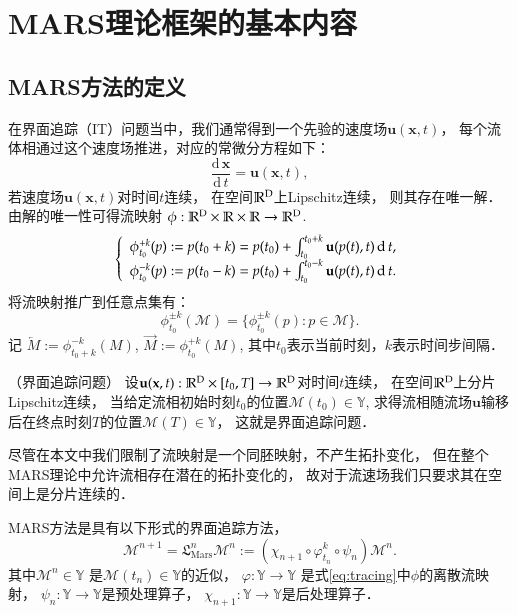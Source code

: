 \section{MARS理论框架的基本内容}
\label{sec:MARS}
\subsection{MARS方法的定义}
在界面追踪（IT）问题当中，我们通常得到一个先验的速度场$\mathbf{u}(\mathbf{x},t)$，
每个流体相通过这个速度场推进，对应的常微分方程如下：
\begin{equation}
\label{volEquation}
\frac{\mathrm{d}\, \mathbf{x}}{\mathrm{d}\, t}=\mathbf{u}(\mathbf{x},t),
\end{equation}
若速度场$\mathbf{u}(\mathbf{x},t)$对时间$t$连续，
在空间$\mathbb{R}^{\textup{D}}$上Lipschitz连续，
则其存在唯一解．由解的唯一性可得流映射 $\phi: \mathbb{R}^{\textup{D}}\times \mathbb{R}\times\mathbb{R}\rightarrow \mathbb{R}^{\text{D}}$.
\begin{equation} 
\label{eq:tracing}
\renewcommand{\arraystretch}{1.3}
\left\{
\begin{array}{l}
\phi_{t_0}^{+k}(p) := p(t_0+k) 
= p(t_0) + \int_{t_0}^{t_0+k} \mathbf{u}(p(t),t)\,\mathrm{d}\, t,
\\
\phi_{t_0}^{-k}(p) := p(t_0-k) 
= p(t_0) + \int_{t_0}^{t_0-k} \mathbf{u}(p(t),t)\,\mathrm{d}\,t.
\end{array}
\right.
\end{equation}
将流映射推广到任意点集有：
\begin{displaymath}
\phi_{t_0}^{\pm k}({\mathcal M})  
= \{\phi_{t_0}^{\pm k}(p) : p\in {\mathcal M}\}.
\end{displaymath}
记 $\overleftarrow{M}:=\phi_{t_0+k}^{-k}(M)$, $\overrightarrow{M}:=\phi_{t_0}^{+k}(M)$, 
其中$t_0$表示当前时刻，$k$表示时间步间隔．

\begin{defn}（界面追踪问题）
	\label{defn:ITproblem}
	设$\mathbf{u}(\mathbf{x},t):\mathbb{R}^{\textup{D}} \times[t_0,T] \rightarrow\mathbb{R}^{\text{D}}$对时间$t$连续，
	在空间$\mathbb{R}^{\textup{D}}$上分片Lipschitz连续，
	当给定流相初始时刻$t_0$的位置$\mathcal{M}(t_0)\in \mathbb{Y}$,
	求得流相随流场$\mathbf{u}$输移后在终点时刻$T$的位置$\mathcal{M}(T)\in \mathbb{Y}$，
	这就是界面追踪问题．
\end{defn}
尽管在本文中我们限制了流映射是一个同胚映射，不产生拓扑变化，
但在整个MARS理论中允许流相存在潜在的拓扑变化的，
故对于流速场我们只要求其在空间上是分片连续的．


\begin{defn}
	\label{defn:MARS}
	MARS方法是具有以下形式的界面追踪方法，
	\begin{equation*}
	\label{eq:interfaceTrackingMethod}
	{\mathcal M}^{n+1}={\mathfrak L}_{\mathrm{Mars}}^n {\mathcal M}^n
	:= \left(\chi_{n+1}\circ\varphi_{t_n}^k\circ\psi_n
	\right){\mathcal M}^n.
	\end{equation*}
	其中$\mathcal{M}^n\in\mathbb{Y}$ 是$\mathcal{M}(t_n)\in\mathbb{Y}$的近似，
	$\varphi:\mathbb{Y}\rightarrow
	\mathbb{Y}$ 是式\eqref{eq:tracing}中$\phi$的离散流映射， 
	$\psi_n:\mathbb{Y}\rightarrow \mathbb{Y}$是预处理算子，
	$\chi_{n+1}:\mathbb{Y}\rightarrow \mathbb{Y}$是后处理算子．
\end{defn}

